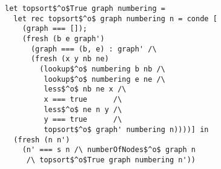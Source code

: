 \begin{figure}[!t]
  \centering
  \begin{minipage}{0.49\textwidth}
    \begin{lstlisting}[label={topsort_spec}, caption={Specialized relational intepreter for topologic sort of a graph}, captionpos=b, frame=tb]
let topsort$^o$True graph numbering =
  let rec topsort$^o$ graph numbering n = conde [
    (graph === []);
    (fresh (b e graph')
      (graph === (b, e) : graph' /\
      (fresh (x y nb ne)
        (lookup$^o$ numbering b nb /\
         lookup$^o$ numbering e ne /\
         less$^o$ nb ne x /\
         x === true      /\
         less$^o$ ne n y /\
         y === true      /\
         topsort$^o$ graph' numbering n))))] in
  (fresh (n n')
    (n' === s n /\ numberOfNodes$^o$ graph n
     /\ topsort$^o$True graph numbering n'))
    \end{lstlisting}
  \end{minipage}
\end{figure}
